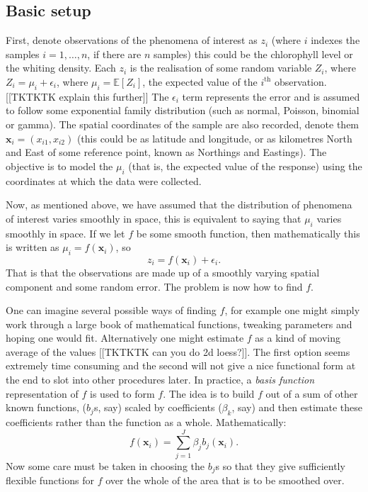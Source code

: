 \subsection{Basic setup}

First, denote observations of the phenomena of interest as $z_i$ (where $i$ indexes the samples $i=1,\ldots,n$, if there are $n$ samples) this could be the chlorophyll level or the whiting density. Each  $z_i$ is the realisation of some random variable $Z_i$, where $Z_i=\mu_i+\epsilon_i$, where $\mu_i=\mathbb{E}[Z_i]$, the expected value of the $i^\text{th}$ observation.[[TKTKTK explain this further]] The $\epsilon_i$ term represents the error and is assumed to follow some exponential family distribution (such as normal, Poisson, binomial or gamma). The spatial coordinates of the sample are also recorded, denote them $\mathbf{x}_i = (x_{i1}, x_{i2})$ (this could be as latitude and longitude, or as kilometres North and East of some reference point, known as Northings and Eastings). The objective is to model the $\mu_i$ (that is, the expected value of the response) using the coordinates at which the data were collected.

Now, as mentioned above, we have assumed that the distribution of phenomena of interest varies smoothly in space, this is equivalent to saying that $\mu_i$ varies smoothly in space. If we let $f$ be some smooth function, then mathematically this is written as $\mu_i = f(\mathbf{x}_i)$, so
\begin{equation}
z_i = f(\mathbf{x}_i) + \epsilon_i.
\end{equation}
That is that the observations are made up of a smoothly varying spatial component and some random error. The problem is now how to find $f$.

One can imagine several possible ways of finding $f$, for example one might simply work through a large book of mathematical functions, tweaking parameters and hoping one would fit. Alternatively one might estimate $f$ as a kind of moving average of the values [[TKTKTK can you do 2d loess?]]. The first option seems extremely time consuming and the second will not give a nice functional form at the end to slot into other procedures later. In practice, a \textit{basis function} representation of $f$ is used to form $f$. The idea is to build $f$ out of a sum of other known functions, ($b_j$s, say) scaled by coefficients ($\beta_k$, say) and then estimate these coefficients rather than the function as a whole. Mathematically:
\begin{equation}
 f(\mathbf{x}_{i}) = \sum_{j=1}^J \beta_j b_j(\mathbf{x}_{i}).
\label{intro-basisdecomp}
\end{equation}
Now some care must be taken in choosing the $b_j$s so that they give sufficiently flexible functions for $f$ over the whole of the area that is to be smoothed over.

